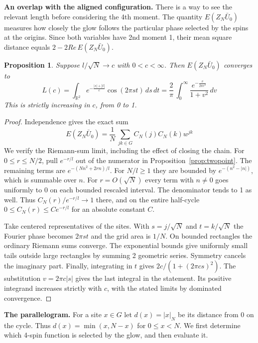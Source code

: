 \documentclass[11pt,a4paper]{article}
\newtheorem{prop}[thm]{Proposition}
\theoremstyle{remark}
\begin{document}
\medskip

\noindent\textbf{An overlap with the aligned configuration.} 
There is a way to see the relevant length before considering the 4th
moment. The quantity $E(Z_N\bar U_0)$ measures how closely the glow
follows the particular phase selected by the spins at the origins. Since
both variables have 2nd moment 1, their mean square distance equals
$2-2Re\,E(Z_N\bar U_0)$.

\begin{samepage}
\begin{prop}\label{prop:overlap}
Suppose $l/\sqrt N\to c$ with $0<c<\infty$. Then $E(Z_N\bar U_0)$
converges to
\[
 L(c)=\int_{\mathbb R^2} e^{-\frac{|s|+|t|}{c}}\cos(2\pi st)\,ds\,dt
     =\frac2\pi\,\int_0^\infty
           \frac{e^{-\frac{v}{2\pi c^2}}}{1+v^2}\,dv
\]
This is strictly increasing in $c$, from 0 to 1.
\end{prop}
\end{samepage}
\begin{proof}
Independence gives the exact sum
\[
  E(Z_N\bar U_0)=\frac1N\,\sum_{jk\in G}C_N(j)C_N(k)w^{jk}
\]
We verify the Riemann-sum limit, including the effect of closing the
chain. For $0\le r\le N/2$, pull $e^{-r/l}$ out of the numerator
in Proposition~\ref{prop:twopoint}. The remaining terms are
$e^{-(Nn^2+2rn)/l}$. For $N/l\ge1$ they are bounded by
$e^{-(n^2-|n|)}$, which is summable over $n$. For $r=O(\sqrt N)$
every term with $n\ne0$ goes uniformly to 0 on each bounded rescaled
interval. The denominator tends to 1 as well. Thus
$C_N(r)/e^{-r/l}\to1$ there, and on the entire half-cycle
$0\le C_N(r)\le C e^{-r/l}$ for an absolute constant $C$.

Take centered representatives of the sites. With $s=j/\sqrt N$ and
$t=k/\sqrt N$ the Fourier phase becomes $2\pi st$ and the grid area is
$1/N$. On bounded rectangles the ordinary Riemann sums converge.
The exponential bounds give uniformly small tails outside large rectangles
by summing 2 geometric series. Symmetry cancels the imaginary part.
Finally, integrating in $t$ gives $2c/(1+(2\pi cs)^2)$. The substitution
$v=2\pi c|s|$ gives the last integral in the statement. Its positive
integrand increases strictly with $c$, with the stated limits by dominated
convergence.
\end{proof}

\medskip
\noindent\textbf{The parallelogram.}
For a site $x\in G$ let $d(x)=|x|_N$ be its distance from 0 on the
cycle. Thus $d(x)=\min(x,N-x)$ for $0\le x<N$. We first determine which
4-spin function is selected by the glow, and then evaluate it.
\end{document}
